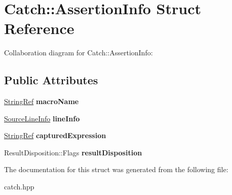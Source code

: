 \hypertarget{structCatch_1_1AssertionInfo}{}\section{Catch\+:\+:Assertion\+Info Struct Reference}
\label{structCatch_1_1AssertionInfo}


Collaboration diagram for Catch\+:\+:Assertion\+Info\+:
\subsection*{Public Attributes}
\begin{DoxyCompactItemize}
\item 
\mbox{\label{structCatch_1_1AssertionInfo_aaf3fbb9f1fe09c879ba3d877584e3056}} 
\hyperlink{classCatch_1_1StringRef}{String\+Ref} {\bfseries macro\+Name}
\item 
\mbox{\label{structCatch_1_1AssertionInfo_a17bdbb404ba12658034f833be2f4c3e7}} 
\hyperlink{structCatch_1_1SourceLineInfo}{Source\+Line\+Info} {\bfseries line\+Info}
\item 
\mbox{\label{structCatch_1_1AssertionInfo_accd36744b4acaa3a691a72df0b42190f}} 
\hyperlink{classCatch_1_1StringRef}{String\+Ref} {\bfseries captured\+Expression}
\item 
\mbox{\label{structCatch_1_1AssertionInfo_a60353b3632ab2f827162f2b2d6911073}} 
Result\+Disposition\+::\+Flags {\bfseries result\+Disposition}
\end{DoxyCompactItemize}


The documentation for this struct was generated from the following file\+:\begin{DoxyCompactItemize}
\item 
catch.\+hpp\end{DoxyCompactItemize}
